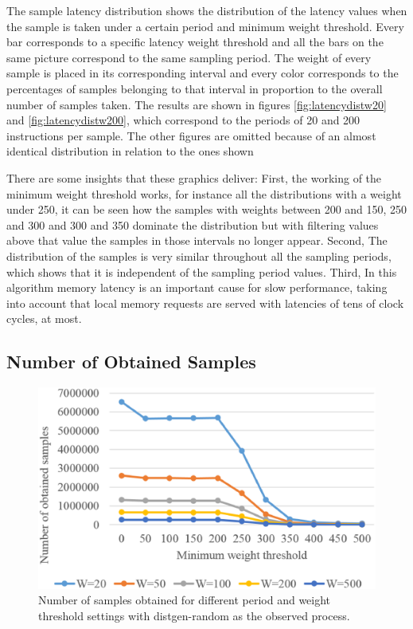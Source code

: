 The sample latency distribution shows the distribution of the latency values when the sample is taken under a certain period and minimum weight threshold. Every bar corresponds to a specific latency weight threshold and all the bars on the same picture correspond to the same sampling period. The weight of every sample is placed in its corresponding interval and every color corresponds to the percentages of samples belonging to that interval in proportion to the overall number of samples taken.  The results are shown in figures \ref{fig:latencydistw20} and \ref{fig:latencydistw200}, which correspond to the periods of 20 and 200 instructions per sample. The other figures are omitted because of an almost identical distribution in relation to the ones shown

There are some insights that these graphics deliver: First, the working of the minimum weight threshold works, for instance all the distributions with a weight under 250, it can be seen how the samples with weights between 200 and 150, 250 and 300 and 300 and 350 dominate the distribution but with filtering values above that value the samples in those intervals no longer appear. Second, The distribution of the samples is very similar throughout all the sampling periods, which shows that it is independent of the sampling period values. Third, In this algorithm memory latency is an important cause for slow performance, taking into account that local memory requests are served with latencies of tens of clock cycles, at most.


\subsection{Number of Obtained Samples}\label{subsection:pmu-obtainedsamp}


\begin{figure}[th]
	\centering
		\includegraphics[width=.8\textwidth]{figures/number-samples.eps}
		\caption{Number of samples obtained for different period and weight threshold settings with distgen-random as the observed process.}
		\label{fig:pmu-obtainedsamp}
\end{figure}

